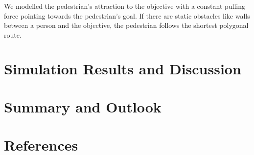 \documentclass[11pt]{article}
\begin{document}
We modelled the pedestrian's attraction to the objective with a constant pulling force pointing towards the pedestrian's goal. If there are static obstacles like walls between a person and the objective, the pedestrian follows the shortest polygonal route.


\section{Simulation Results and Discussion}

\section{Summary and Outlook}

\section{References}







\end{document}
